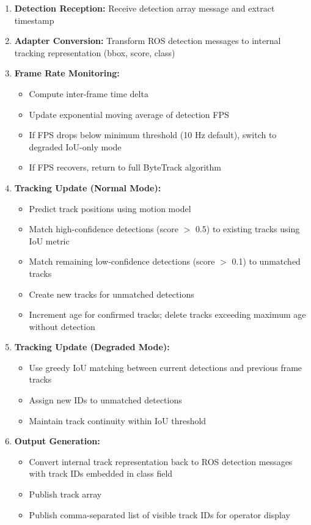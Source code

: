 \documentclass[12pt,a4paper]{report}
\begin{document}
\begin{enumerate}
    \item \textbf{Detection Reception:} Receive detection array message and extract timestamp
    \item \textbf{Adapter Conversion:} Transform ROS detection messages to internal tracking representation (bbox, score, class)
    \item \textbf{Frame Rate Monitoring:}
    \begin{itemize}
        \item Compute inter-frame time delta
        \item Update exponential moving average of detection FPS
        \item If FPS drops below minimum threshold (10 Hz default), switch to degraded IoU-only mode
        \item If FPS recovers, return to full ByteTrack algorithm
    \end{itemize}
    \item \textbf{Tracking Update (Normal Mode):}
    \begin{itemize}
        \item Predict track positions using motion model
        \item Match high-confidence detections (score $>$ 0.5) to existing tracks using IoU metric
        \item Match remaining low-confidence detections (score $>$ 0.1) to unmatched tracks
        \item Create new tracks for unmatched detections
        \item Increment age for confirmed tracks; delete tracks exceeding maximum age without detection
    \end{itemize}
    \item \textbf{Tracking Update (Degraded Mode):}
    \begin{itemize}
        \item Use greedy IoU matching between current detections and previous frame tracks
        \item Assign new IDs to unmatched detections
        \item Maintain track continuity within IoU threshold
    \end{itemize}
    \item \textbf{Output Generation:}
    \begin{itemize}
        \item Convert internal track representation back to ROS detection messages with track IDs embedded in class field
        \item Publish track array
        \item Publish comma-separated list of visible track IDs for operator display
    \end{itemize}
\end{enumerate}
\end{document}
